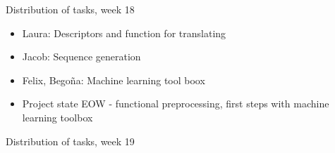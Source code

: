 \documentclass[ignorenonframetext,]{beamer}
\begin{document}
\begin{frame}{Distribution of tasks, week 18}
\protect\hypertarget{distribution-of-tasks-week-18}{}

\begin{itemize}
\item
  Laura: Descriptors and function for translating
\item
  Jacob: Sequence generation
\item
  Felix, Begoña: Machine learning tool boox
\item
  Project state EOW - functional preprocessing, first steps with machine
  learning toolbox
\end{itemize}

\end{frame}

\begin{frame}{Distribution of tasks, week 19}
\protect\hypertarget{distribution-of-tasks-week-19}{}

\end{frame}
\end{document}
